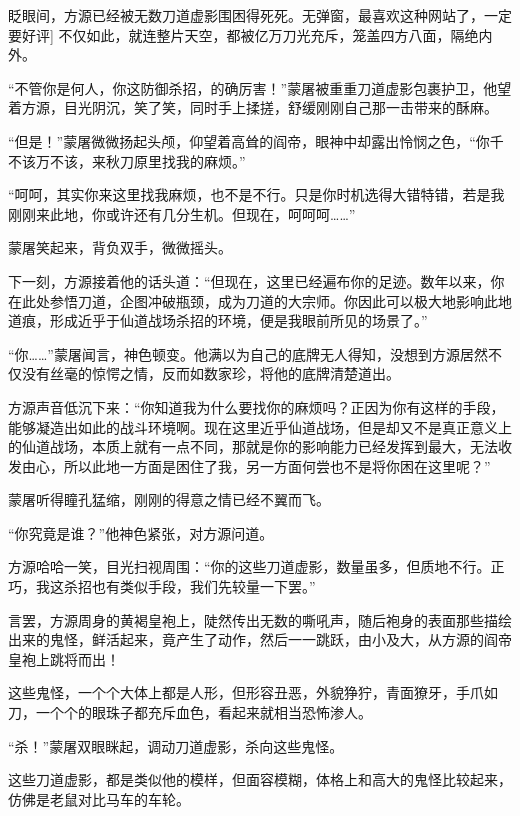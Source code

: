 
\begin{this_body}



眨眼间，方源已经被无数刀道虚影围困得死死。无弹窗，最喜欢这种网站了，一定要好评] 不仅如此，就连整片天空，都被亿万刀光充斥，笼盖四方八面，隔绝内外。

“不管你是何人，你这防御杀招，的确厉害！”蒙屠被重重刀道虚影包裹护卫，他望着方源，目光阴沉，笑了笑，同时手上揉搓，舒缓刚刚自己那一击带来的酥麻。

“但是！”蒙屠微微扬起头颅，仰望着高耸的阎帝，眼神中却露出怜悯之色，“你千不该万不该，来秋刀原里找我的麻烦。”

“呵呵，其实你来这里找我麻烦，也不是不行。只是你时机选得大错特错，若是我刚刚来此地，你或许还有几分生机。但现在，呵呵呵……”

蒙屠笑起来，背负双手，微微摇头。

下一刻，方源接着他的话头道：“但现在，这里已经遍布你的足迹。数年以来，你在此处参悟刀道，企图冲破瓶颈，成为刀道的大宗师。你因此可以极大地影响此地道痕，形成近乎于仙道战场杀招的环境，便是我眼前所见的场景了。”

“你……”蒙屠闻言，神色顿变。他满以为自己的底牌无人得知，没想到方源居然不仅没有丝毫的惊愕之情，反而如数家珍，将他的底牌清楚道出。

方源声音低沉下来：“你知道我为什么要找你的麻烦吗？正因为你有这样的手段，能够凝造出如此的战斗环境啊。现在这里近乎仙道战场，但是却又不是真正意义上的仙道战场，本质上就有一点不同，那就是你的影响能力已经发挥到最大，无法收发由心，所以此地一方面是困住了我，另一方面何尝也不是将你困在这里呢？”

蒙屠听得瞳孔猛缩，刚刚的得意之情已经不翼而飞。

“你究竟是谁？”他神色紧张，对方源问道。

方源哈哈一笑，目光扫视周围：“你的这些刀道虚影，数量虽多，但质地不行。正巧，我这杀招也有类似手段，我们先较量一下罢。”

言罢，方源周身的黄褐皇袍上，陡然传出无数的嘶吼声，随后袍身的表面那些描绘出来的鬼怪，鲜活起来，竟产生了动作，然后一一跳跃，由小及大，从方源的阎帝皇袍上跳将而出！

这些鬼怪，一个个大体上都是人形，但形容丑恶，外貌狰狞，青面獠牙，手爪如刀，一个个的眼珠子都充斥血色，看起来就相当恐怖渗人。

“杀！”蒙屠双眼眯起，调动刀道虚影，杀向这些鬼怪。

这些刀道虚影，都是类似他的模样，但面容模糊，体格上和高大的鬼怪比较起来，仿佛是老鼠对比马车的车轮。


\end{this_body}
